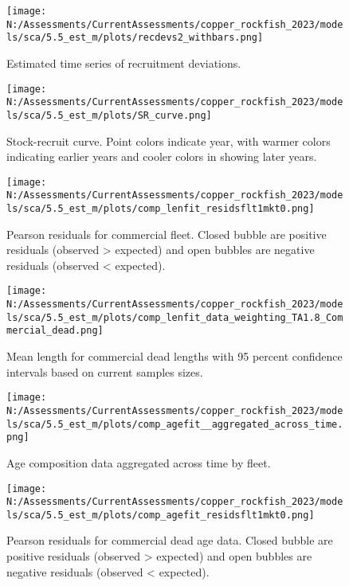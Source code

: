 \documentclass[11pt,
  english,
  letterpaper,
]{article}
\begin{document}
\begin{figure}
\centering
\texttt{[image: N:/Assessments/CurrentAssessments/copper\_rockfish\_2023/models/sca/5.5\_est\_m/plots/recdevs2\_withbars.png]}
\caption{Estimated time series of recruitment deviations.\label{fig:rec-devs}}
\end{figure}

\begin{figure}
\centering
\texttt{[image: N:/Assessments/CurrentAssessments/copper\_rockfish\_2023/models/sca/5.5\_est\_m/plots/SR\_curve.png]}
\caption{Stock-recruit curve. Point colors indicate year, with warmer colors indicating earlier years and cooler colors in showing later years.\label{fig:bh-curve}}
\end{figure}

\begin{figure}
\centering
\texttt{[image: N:/Assessments/CurrentAssessments/copper\_rockfish\_2023/models/sca/5.5\_est\_m/plots/comp\_lenfit\_residsflt1mkt0.png]}
\caption{Pearson residuals for commercial fleet. Closed bubble are positive residuals (observed \textgreater{} expected) and open bubbles are negative residuals (observed \textless{} expected).\label{fig:com-dead-pearson}}
\end{figure}

\begin{figure}
\centering
\texttt{[image: N:/Assessments/CurrentAssessments/copper\_rockfish\_2023/models/sca/5.5\_est\_m/plots/comp\_lenfit\_data\_weighting\_TA1.8\_Commercial\_dead.png]}
\caption{Mean length for commercial dead lengths with 95 percent confidence intervals based on current samples sizes.\label{fig:com-dead-mean-len-fit}}
\end{figure}

\begin{figure}
\centering
\texttt{[image: N:/Assessments/CurrentAssessments/copper\_rockfish\_2023/models/sca/5.5\_est\_m/plots/comp\_agefit\_\_aggregated\_across\_time.png]}
\caption{Age composition data aggregated across time by fleet.\label{fig:agg-marg-age-fit}}
\end{figure}

\begin{figure}
\centering
\texttt{[image: N:/Assessments/CurrentAssessments/copper\_rockfish\_2023/models/sca/5.5\_est\_m/plots/comp\_agefit\_residsflt1mkt0.png]}
\caption{Pearson residuals for commercial dead age data. Closed bubble are positive residuals (observed \textgreater{} expected) and open bubbles are negative residuals (observed \textless{} expected).\label{fig:com-dead-age-pearson}}
\end{figure}
\end{document}
